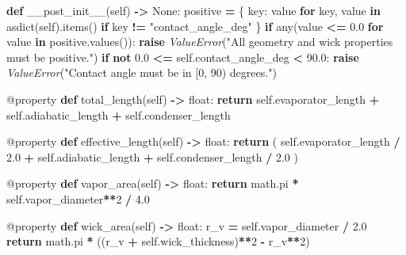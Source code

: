 \documentclass[
  12pt,a4paper,oneside]{report}
\newenvironment{Shaded}{\begin{snugshade}}{\end{snugshade}}
\newcommand{\AttributeTok}[1]{\textcolor[rgb]{0.77,0.63,0.00}{#1}}
\newcommand{\BuiltInTok}[1]{#1}
\newcommand{\ControlFlowTok}[1]{\textcolor[rgb]{0.13,0.29,0.53}{\textbf{#1}}}
\newcommand{\DecValTok}[1]{\textcolor[rgb]{0.00,0.00,0.81}{#1}}
\newcommand{\FloatTok}[1]{\textcolor[rgb]{0.00,0.00,0.81}{#1}}
\newcommand{\KeywordTok}[1]{\textcolor[rgb]{0.13,0.29,0.53}{\textbf{#1}}}
\newcommand{\NormalTok}[1]{#1}
\newcommand{\OperatorTok}[1]{\textcolor[rgb]{0.81,0.36,0.00}{\textbf{#1}}}
\newcommand{\PreprocessorTok}[1]{\textcolor[rgb]{0.56,0.35,0.01}{\textit{#1}}}
\newcommand{\StringTok}[1]{\textcolor[rgb]{0.31,0.60,0.02}{#1}}
\newcommand{\VariableTok}[1]{\textcolor[rgb]{0.00,0.00,0.00}{#1}}
\begin{document}
\begin{Shaded}
\begin{Highlighting}[]
    \KeywordTok{def}\NormalTok{ \_\_post\_init\_\_(}\VariableTok{self}\NormalTok{) }\OperatorTok{{-}\textgreater{}} \VariableTok{None}\NormalTok{:}
\NormalTok{        positive }\OperatorTok{=}\NormalTok{ \{}
\NormalTok{            key: value }\ControlFlowTok{for}\NormalTok{ key, value }\KeywordTok{in}\NormalTok{ asdict(}\VariableTok{self}\NormalTok{).items()}
            \ControlFlowTok{if}\NormalTok{ key }\OperatorTok{!=} \StringTok{"contact\_angle\_deg"}
\NormalTok{        \}}
        \ControlFlowTok{if} \BuiltInTok{any}\NormalTok{(value }\OperatorTok{\textless{}=} \FloatTok{0.0} \ControlFlowTok{for}\NormalTok{ value }\KeywordTok{in}\NormalTok{ positive.values()):}
            \ControlFlowTok{raise} \PreprocessorTok{ValueError}\NormalTok{(}\StringTok{"All geometry and wick properties must be positive."}\NormalTok{)}
        \ControlFlowTok{if} \KeywordTok{not} \FloatTok{0.0} \OperatorTok{\textless{}=} \VariableTok{self}\NormalTok{.contact\_angle\_deg }\OperatorTok{\textless{}} \FloatTok{90.0}\NormalTok{:}
            \ControlFlowTok{raise} \PreprocessorTok{ValueError}\NormalTok{(}\StringTok{"Contact angle must be in [0, 90) degrees."}\NormalTok{)}

    \AttributeTok{@property}
    \KeywordTok{def}\NormalTok{ total\_length(}\VariableTok{self}\NormalTok{) }\OperatorTok{{-}\textgreater{}} \BuiltInTok{float}\NormalTok{:}
        \ControlFlowTok{return} \VariableTok{self}\NormalTok{.evaporator\_length }\OperatorTok{+} \VariableTok{self}\NormalTok{.adiabatic\_length }\OperatorTok{+} \VariableTok{self}\NormalTok{.condenser\_length}

    \AttributeTok{@property}
    \KeywordTok{def}\NormalTok{ effective\_length(}\VariableTok{self}\NormalTok{) }\OperatorTok{{-}\textgreater{}} \BuiltInTok{float}\NormalTok{:}
        \ControlFlowTok{return}\NormalTok{ (}
            \VariableTok{self}\NormalTok{.evaporator\_length }\OperatorTok{/} \FloatTok{2.0} \OperatorTok{+} \VariableTok{self}\NormalTok{.adiabatic\_length}
            \OperatorTok{+} \VariableTok{self}\NormalTok{.condenser\_length }\OperatorTok{/} \FloatTok{2.0}
\NormalTok{        )}

    \AttributeTok{@property}
    \KeywordTok{def}\NormalTok{ vapor\_area(}\VariableTok{self}\NormalTok{) }\OperatorTok{{-}\textgreater{}} \BuiltInTok{float}\NormalTok{:}
        \ControlFlowTok{return}\NormalTok{ math.pi }\OperatorTok{*} \VariableTok{self}\NormalTok{.vapor\_diameter}\OperatorTok{**}\DecValTok{2} \OperatorTok{/} \FloatTok{4.0}

    \AttributeTok{@property}
    \KeywordTok{def}\NormalTok{ wick\_area(}\VariableTok{self}\NormalTok{) }\OperatorTok{{-}\textgreater{}} \BuiltInTok{float}\NormalTok{:}
\NormalTok{        r\_v }\OperatorTok{=} \VariableTok{self}\NormalTok{.vapor\_diameter }\OperatorTok{/} \FloatTok{2.0}
        \ControlFlowTok{return}\NormalTok{ math.pi }\OperatorTok{*}\NormalTok{ ((r\_v }\OperatorTok{+} \VariableTok{self}\NormalTok{.wick\_thickness)}\OperatorTok{**}\DecValTok{2} \OperatorTok{{-}}\NormalTok{ r\_v}\OperatorTok{**}\DecValTok{2}\NormalTok{)}


\end{Highlighting}
\end{Shaded}
\end{document}
